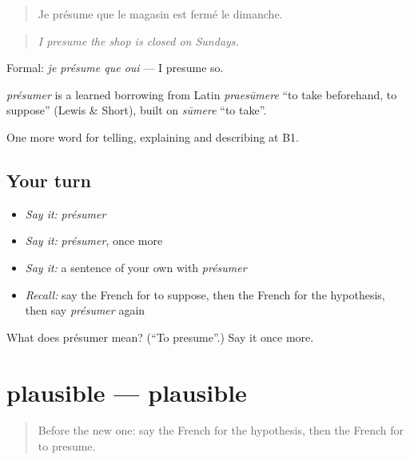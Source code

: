 \begin{quote}
Je présume que le magasin est fermé le dimanche.
\end{quote}

\begin{quote}
\emph{I presume the shop is closed on Sundays.}
\end{quote}

Formal: \emph{je présume que oui} — I presume so.

\begin{cousinweb}
\emph{présumer} is a learned borrowing from Latin \emph{praesūmere} \textquotedblleft{}to take beforehand, to suppose\textquotedblright{} (Lewis \& Short), built on \emph{sūmere} \textquotedblleft{}to take\textquotedblright{}.
\end{cousinweb}

\begin{grammarlens}[title={What you've built}]
One more word for telling, explaining and describing at B1.
\end{grammarlens}

\subsection*{Your turn}
\begin{itemize}
\raggedright
  \item \emph{Say it:} \emph{présumer}
  \item \emph{Say it:} \emph{présumer}, once more
  \item \emph{Say it:} a sentence of your own with \emph{présumer}
  \item \emph{Recall:} say the French for to suppose, then the French for the hypothesis, then say \emph{présumer} again
\end{itemize}

\begin{tcolorbox}[breakable,colback=teal!4,colframe=teal!35!black,title={Before you move on}]
What does présumer mean? (\textquotedblleft{}To presume\textquotedblright{}.) Say it once more.
\end{tcolorbox}
\section[plausible]{plausible — plausible}

\label{lesson:FR-C367-plausible}



\begin{quote}
Before the new one: say the French for the hypothesis, then the French for to presume.
\end{quote}

